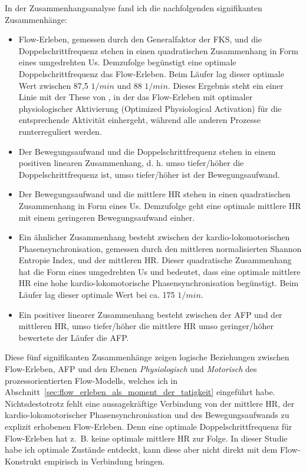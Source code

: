 In der Zusammenhangsanalyse fand ich die nachfolgenden signifikanten Zusammenhänge: 
\begin{itemize}
	
	\item Flow-Erleben, gemessen durch den Generalfaktor der \ac{FKS}, und die Doppelschrittfrequenz stehen in einen quadratischen Zusammenhang in Form eines umgedrehten Us. Demzufolge begünstigt eine optimale Doppelschrittfrequenz das Flow-Erleben. Beim Läufer lag dieser optimale Wert zwischen 87,5 $1/min$ und 88 $1/min$. Dieses Ergebnis steht ein einer Linie mit der These von \citet[][S.~148]{Peifer2012}, in der das Flow-Erleben mit optimaler physiologischer Aktivierung (Optimized Physiological Activation) für die entsprechende Aktivität einhergeht, während alle anderen Prozesse runterreguliert werden.
	
	\item Der Bewegungsaufwand und die Doppelschrittfrequenz stehen in einem positiven linearen Zusammenhang, d. h. umso tiefer/höher die Doppelschrittfrequenz ist, umso tiefer/höher ist der Bewegungsaufwand.
	
	\item Der Bewegungsaufwand und die mittlere \ac{HR} stehen in einen quadratischen Zusammenhang in Form eines Us. Demzufolge geht eine optimale mittlere \ac{HR} mit einem geringeren Bewegungsaufwand einher.
	
	\item Ein ähnlicher Zusammenhang besteht zwischen der kardio-lokomotorischen Phasensynchronisation, gemessen durch den mittleren normalisierten Shannon Entropie Index, und der mittleren \ac{HR}. Dieser quadratische Zusammenhang hat die Form eines umgedrehten Us und bedeutet, dass eine optimale mittlere \ac{HR} eine hohe kardio-lokomotorische Phasensynchronisation begünstigt. Beim Läufer lag dieser optimale Wert bei ca. 175 $1/min$.
	
	\item Ein positiver linearer Zusammenhang besteht zwischen der \ac{AFP} und der mittleren \ac{HR}, umso tiefer/höher die mittlere \ac{HR} umso geringer/höher bewertete der Läufer die \ac{AFP}. 
\end{itemize}

Diese fünf signifikanten Zusammenhänge zeigen logische Beziehungen zwischen Flow-Erleben, \ac{AFP} und den Ebenen \emph{Physiologisch} und \emph{Motorisch} des prozessorientierten Flow-Modells, welches ich in Abschnitt~\ref{sec:flow_erleben_als_moment_der_tatigkeit} eingeführt habe. Nichtsdestotrotz fehlt eine aussagekräftige Verbindung von der mittlere \ac{HR}, der kardio-lokomotorischer Phasensynchronisation und des Bewegungsaufwands zu explizit erhobenen Flow-Erleben. Denn eine optimale Doppelschrittfrequenz für Flow-Erleben hat z.~B. keine optimale mittlere \ac{HR} zur Folge. In dieser Studie habe ich optimale Zustände entdeckt, kann diese aber nicht direkt mit dem Flow-Konstrukt empirisch in Verbindung bringen. 

